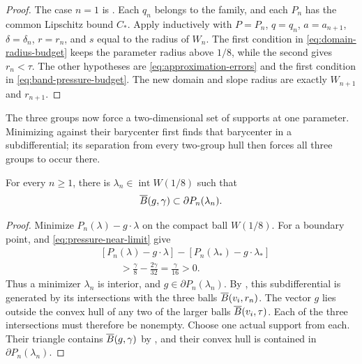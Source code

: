 \begin{proof}
The case \(n=1\) is .
Each \(q_n\) belongs to the family, and each \(P_n\) has the common
Lipschitz bound \(C_*\).  Apply  inductively with
\(P=P_n\), \(q=q_n\), \(a=a_{n+1}\), \(\delta=\delta_n\),
\(r=r_n\), and \(s\) equal to the radius of \(W_n\).
The first condition in \eqref{eq:domain-radius-budget} keeps the
parameter radius above \(1/8\), while the second gives \(r_n<\tau\).
The other hypotheses are \eqref{eq:approximation-errors} and the first
condition in \eqref{eq:band-pressure-budget}.  The new domain and
slope radius are exactly \(W_{n+1}\) and \(r_{n+1}\).
\end{proof}

The three groups now force a two-dimensional set of supports at one
parameter.  Minimizing against their barycenter first finds that
barycenter in a subdifferential; its separation from every two-group
hull then forces all three groups to occur there.

\begin{proposition}\label{m:pressure-ball}
For every \(n\ge1\), there is
\(\lambda_n\in\operatorname{int}W(1/8)\) such that
\begin{equation}\label{eq:common-pressure-ball}
 \overline B(g,\gamma)\subset\partial P_n(\lambda_n).
\end{equation}
\end{proposition}

\begin{proof}
Minimize \(P_n(\lambda)-g\cdot\lambda\) on the compact ball \(W(1/8)\).
For a boundary point,  and
\eqref{eq:pressure-near-limit} give
\begin{align*}
 &[P_n(\lambda)-g\cdot\lambda]
   -[P_n(\lambda_*)-g\cdot\lambda_*]\\
 &\hspace{2em}>
   \frac{\gamma}{8}-\frac{2\gamma}{32}
   =\frac{\gamma}{16}>0.
\end{align*}
Thus a minimizer \(\lambda_n\) is interior, and
\(g\in\partial P_n(\lambda_n)\).
By , this subdifferential is generated by its
intersections with the three balls \(\overline B(v_i,r_n)\).
The vector \(g\) lies outside the convex hull of any two of the larger
balls \(\overline B(v_i,\tau)\).
Each of the three intersections must therefore be nonempty.
Choose one actual support from each.
Their triangle contains \(\overline B(g,\gamma)\) by , and
their convex hull is contained in \(\partial P_n(\lambda_n)\).
\end{proof}

